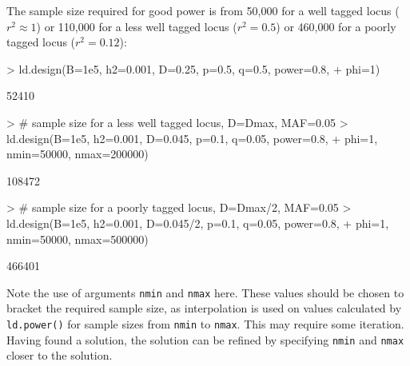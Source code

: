 \documentclass[a4paper,10pt]{amsart}
\begin{document}
The sample size required for good power is from 50,000 for a well
tagged locus ($r^2 \approx 1$) or 110,000 for a less well tagged locus
($r^2=0.5$) or 460,000 for a poorly tagged locus ($r^2=0.12$):
\begin{Schunk}
\begin{Sinput}
> ld.design(B=1e5, h2=0.001, D=0.25, p=0.5, q=0.5, power=0.8, 
+           phi=1) 
\end{Sinput}
\begin{Soutput}
[1] 52410
\end{Soutput}
\begin{Sinput}
> # sample size for a less well tagged locus, D=Dmax, MAF=0.05
> ld.design(B=1e5, h2=0.001, D=0.045, p=0.1, q=0.05, power=0.8, 
+           phi=1, nmin=50000, nmax=200000)
\end{Sinput}
\begin{Soutput}
[1] 108472
\end{Soutput}
\begin{Sinput}
> # sample size for a poorly tagged locus, D=Dmax/2, MAF=0.05
> ld.design(B=1e5, h2=0.001, D=0.045/2, p=0.1, q=0.05, power=0.8, 
+           phi=1, nmin=50000, nmax=500000)
\end{Sinput}
\begin{Soutput}
[1] 466401
\end{Soutput}
\end{Schunk}

Note the use of arguments \texttt{nmin} and \texttt{nmax} here. These values should
be chosen to bracket the required sample size, as interpolation is used on values
calculated by \texttt{ld.power()} for sample sizes from \texttt{nmin} to \texttt{nmax}.
This may require some iteration. Having found a solution, the solution can be refined by
specifying \texttt{nmin} and \texttt{nmax} closer to the solution.


\end{document}

